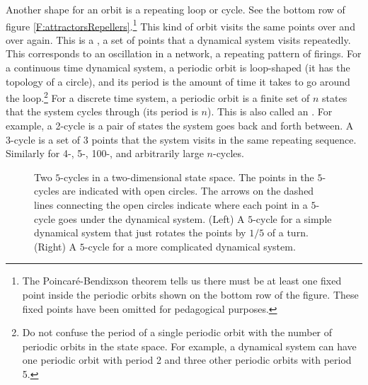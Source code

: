    Another shape for an orbit is a repeating loop or cycle. See the bottom row
of figure \ref{F:attractorsRepellers}.\footnote{The Poincar\'{e}-Bendixson
theorem tells us there must be at least one fixed point inside the periodic
orbits shown on the bottom row of the figure. These fixed points have been
omitted for pedagogical purposes.}  This kind of orbit visits the
same points over and over again. This is a , a set of
points that a dynamical system visits repeatedly. This corresponds to an oscillation
in a network, a repeating pattern of firings.  For a continuous time dynamical
system, a periodic orbit is loop-shaped (it has the topology of a circle), and
its period is the amount of time it takes to go around the loop.\footnote{Do not
confuse the period of a single periodic orbit with the number of periodic
orbits in the state space. For example, a dynamical system can have one
periodic orbit with period 2 and three other periodic orbits with period 5.}
For a discrete time system, a periodic orbit is a finite set of $n$ states that
the system cycles through (its period is $n$). This is also called an
.  For example, a 2-cycle is a pair of states the system goes
back and forth between.  A 3-cycle is a set of 3 points that the system visits in
the same repeating sequence.  Similarly for 4-, 5-, 100-, and arbitrarily large
$n$-cycles.


\begin{figure}[h]
\centering
{}
\caption[Scott Hotton.]{Two $5$-cycles in a two-dimensional state space. The
points in the $5$-cycles are indicated with open circles. The arrows on the
dashed lines connecting the open circles indicate where each point in a
$5$-cycle goes under the dynamical system.  (Left) A $5$-cycle for a simple
dynamical system that just rotates the points by $1/5$ of a turn.  (Right) A
$5$-cycle for a more complicated dynamical system.}
\label{F:Two5cycles}
\end{figure}

